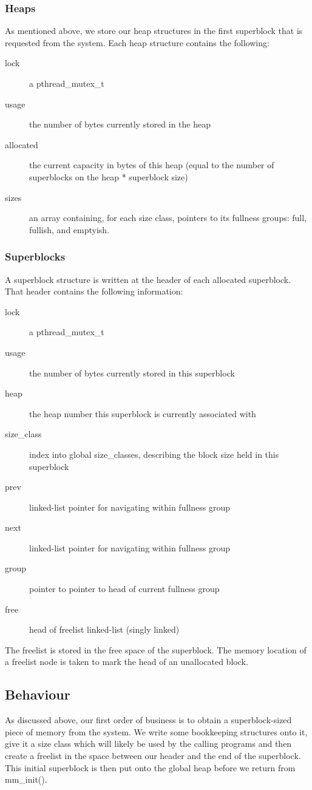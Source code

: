 \documentclass{article}
\begin{document}
\subsubsection{Heaps}
As mentioned above, we store our heap structures in the first superblock
that is requested from the system. Each heap structure contains the following:
\begin{description}
    \item[lock] a pthread\_mutex\_t
    \item[usage] the number of bytes currently stored in the heap
    \item[allocated] the current capacity in bytes of this heap
        (equal to the number of superblocks on the heap * superblock size)
    \item[sizes] an array containing, for each size class, pointers to
        its fullness groups: full, fullish, and emptyish.
\end{description}

\subsubsection{Superblocks}
A superblock structure is written at the header of each allocated superblock.
That header contains the following information:
\begin{description}
    \item[lock] a pthread\_mutex\_t
    \item[usage] the number of bytes currently stored in this superblock
    \item[heap] the heap number this superblock is currently associated with
    \item[size\_class] index into global size\_classes, describing the block
        size held in this superblock
    \item[prev] linked-list pointer for navigating within fullness group
    \item[next] linked-list pointer for navigating within fullness group
    \item[group] pointer to pointer to head of current fullness group
    \item[free] head of freelist linked-list (singly linked)
\end{description}

The freelist is stored in the free space of the superblock. The memory
location of a freelist node is taken to mark the head of an unallocated block.

\subsection {Behaviour}
As discussed above, our first order of business is to obtain a superblock-sized
piece of memory from the system. We write some bookkeeping structures onto it,
give it a size class which will likely be used by the calling programs and then
create a freelist in the space between our header and the end of the
superblock. This initial superblock is then put onto the global heap before we
return from mm\_init().
\end{document}
